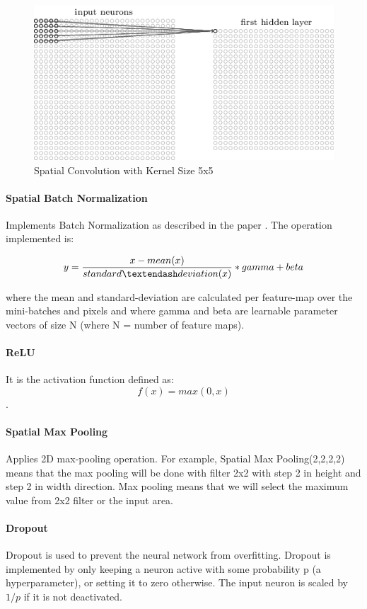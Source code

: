   \begin{figure}[h!]
  \centering
  \includegraphics[width=.4\textwidth]{images/spatialconv.png}
  \caption{Spatial Convolution with Kernel Size 5x5} \label{spatialconv}
  \vspace{-.5cm}
\end{figure}

\paragraph{Spatial Batch Normalization}

Implements Batch Normalization as described in the paper \cite{6}. The operation implemented is:

 $$y=\frac{x - mean(x)}{standard \textendash deviation(x)} * gamma + beta$$
 
 where the mean and standard-deviation are calculated per feature-map over the mini-batches and pixels and where gamma and beta are learnable parameter vectors of size N (where N = number of feature maps).
 
 
 \paragraph{ReLU}
 It is the activation function defined as: $$f(x) = max(0,x)$$.
 
 
 \paragraph{Spatial Max Pooling}
 Applies 2D max-pooling operation. For example, Spatial Max Pooling(2,2,2,2) means that the max pooling will be done with filter 2x2 with step 2 in height and step 2 in width direction. Max pooling means that we will select the maximum value from 2x2 filter or the input area.
 
 
 \paragraph{Dropout}
 Dropout is used to prevent the neural network from overfitting. Dropout is implemented by only keeping a neuron active with some probability p (a hyperparameter), or setting it to zero otherwise. The input neuron is scaled by $1/p$ if it is not deactivated.
 

